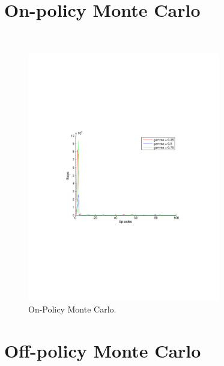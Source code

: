 \documentclass[a4paper,11pt]{article}
\begin{document}
\section*{On-policy Monte Carlo}
~
\begin{figure}[t!]
  \centering
    \includegraphics[trim=4cm 8.5cm 4cm 8.5cm,clip,width=0.75\textwidth]{figures/onmc.pdf}
    \caption{On-Policy Monte Carlo.}
     \label{onmc}
\end{figure}


\section*{Off-policy Monte Carlo}
\end{document}
